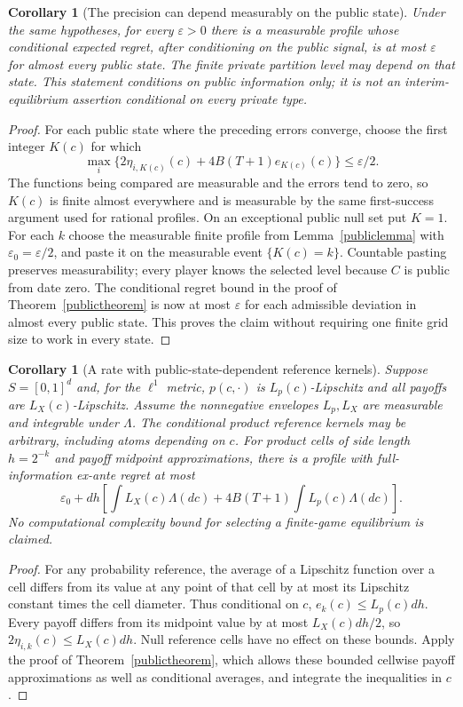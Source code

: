 \documentclass[11pt]{article}
\newtheorem{corollary}[theorem]{Corollary}
\theoremstyle{remark}\newtheorem{remark}[theorem]{Remark}
\begin{document}
\begin{corollary}[The precision can depend measurably on the public state]
\label{publicconditional}
Under the same hypotheses, for every $\varepsilon>0$ there is a
measurable profile whose conditional expected regret, after conditioning
on the public signal, is at most $\varepsilon$ for almost every public
state. The finite private partition level may depend on that state.
This statement conditions on public information only; it is not an
interim-equilibrium assertion conditional on every private type.
\end{corollary}
\begin{proof}
For each public state where the preceding errors converge, choose the
first integer $K(c)$ for which
\[
 \max_i\{2\eta_{i,K(c)}(c)+4B(T+1)e_{K(c)}(c)\}
                                                \leq\varepsilon/2.
\]
The functions being compared are measurable and the errors tend to
zero, so $K(c)$ is finite almost everywhere and is measurable by the
same first-success argument used for rational profiles. On an exceptional
public null set put $K=1$. For each $k$ choose the measurable finite
profile from Lemma~\ref{publiclemma} with
$\varepsilon_0=\varepsilon/2$, and paste it on the measurable event
$\{K(c)=k\}$. Countable pasting preserves measurability; every player
knows the selected level because $C$ is public from date zero.
The conditional regret bound in the proof of
Theorem~\ref{publictheorem} is now at most $\varepsilon$ for each
admissible deviation in almost every public state. This proves the
claim without requiring one finite grid size to work in every state.
\end{proof}

\begin{corollary}[A rate with public-state-dependent reference kernels]
\label{publicmesh}
Suppose $S=[0,1]^d$ and, for the $\ell^1$ metric, $p(c,\cdot)$ is
$L_p(c)$-Lipschitz and all payoffs are $L_X(c)$-Lipschitz. Assume the
nonnegative envelopes $L_p,L_X$ are measurable and integrable under
$\Lambda$. The conditional product reference kernels may be arbitrary,
including atoms depending on $c$. For product cells of side length
$h=2^{-k}$ and payoff midpoint approximations, there is a profile with
full-information ex-ante regret at most
\[
 \varepsilon_0+dh\left[\int L_X(c)\Lambda(dc)
                 +4B(T+1)\int L_p(c)\Lambda(dc)\right].
\]
No computational complexity bound for selecting a finite-game equilibrium
is claimed.
\end{corollary}
\begin{proof}
For any probability reference, the average of a Lipschitz function over
a cell differs from its value at any point of that cell by at most its
Lipschitz constant times the cell diameter. Thus conditional on $c$,
$e_k(c)\leq L_p(c)dh$. Every payoff differs from its midpoint value
by at most $L_X(c)dh/2$, so $2\eta_{i,k}(c)\leq L_X(c)dh$.
Null reference cells have no effect on these bounds. Apply the proof
of Theorem~\ref{publictheorem}, which allows these bounded cellwise
payoff approximations as well as conditional averages, and integrate
the inequalities in $c$.
\end{proof}
\end{document}
